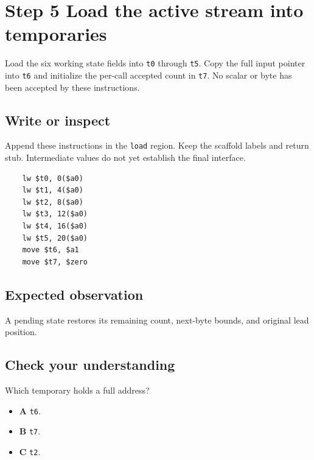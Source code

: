 \section{Step 5 Load the active stream into temporaries}\label{utf8-s05}

Load the six working state fields into \texttt{t0} through \texttt{t5}. Copy the full input pointer into \texttt{t6} and initialize the per-call accepted count in \texttt{t7}. No scalar or byte has been accepted by these instructions.

\subsection{Write or inspect}
Append these instructions in the \texttt{load} region. Keep the scaffold labels and return stub. Intermediate values do not yet establish the final interface.

\begin{verbatim}
    lw $t0, 0($a0)
    lw $t1, 4($a0)
    lw $t2, 8($a0)
    lw $t3, 12($a0)
    lw $t4, 16($a0)
    lw $t5, 20($a0)
    move $t6, $a1
    move $t7, $zero
\end{verbatim}

\subsection{Expected observation}
A pending state restores its remaining count, next-byte bounds, and original lead position.

\subsection{Check your understanding}
Which temporary holds a full address?

\begin{itemize}
  \item \textbf{A} \texttt{t6}.
  \item \textbf{B} \texttt{t7}.
  \item \textbf{C} \texttt{t2}.
\end{itemize}

